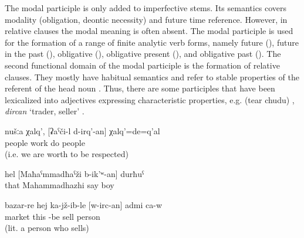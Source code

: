 The modal participle  is only added to imperfective stems. Its semantics covers modality (obligation, deontic necessity) and future time reference. However, in relative clauses the modal meaning is often absent. The modal participle is used for the formation of a range of finite analytic verb forms, namely future (), future in the past (), obligative (), obligative present (), and obligative past (). The second functional domain of the modal participle is the formation of relative clauses. They mostly have habitual semantics and refer to stable properties of the referent of the head noun . Thus, there are some participles that have been lexicalized into adjectives expressing characteristic properties, e.g.  (tear  chudu) , \textit{dircan} `trader, seller' .
	\begin{exe}
		\ex	\label{ex:We are people who were working}
		\gll	nušːa	χalq',	[ʡaˁči-l	d-irq'-an]	χalq'=de=q'al\\
				people	work	do	people\\
		\glt	{} (i.e. we are worth to be respected)

		\ex	\label{ex:the boy called MahammadhazhiVerbs}
		\gll	hel	[Maħaˁmmadħaˁži	b-ik'ʷ-an]	durħuˁ\\
			that	Mahammadhazhi	say	boy	\\
		\glt	{}

		\ex	\label{ex:on the market seated is a trader (a person who sells)}
		\gll	bazar-re	hej	ka-jž-ib-le	[w-irc-an]	admi	ca-w\\
			market	this	-be	sell	person	\\
		\glt	{} (lit. a person who sells)
	\end{exe}

